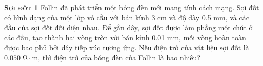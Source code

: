 
\begin{problem}{\textbf{\textsc{Sợi đốt 1}}\hspace{1mm}}
	Follin đã phát triển một bóng đèn mới mang tính cách mạng. Sợi đốt có hình dạng của một lớp vỏ cầu với bán kính 3 cm và độ dày 0.5 mm, và các đầu của sợi đốt đối diện nhau. Để gắn dây, sợi đốt được làm phẳng một chút ở các đầu, tạo thành hai vòng tròn với bán kính 0.01 mm, mỗi vòng hoàn toàn được bao phủ bởi dây tiếp xúc tương ứng. Nếu điện trở của vật liệu sợi đốt là $0.050\;\mathrm{\Omega\cdot m}$, thì điện trở của bóng đèn của Follin là bao nhiêu?
\end{problem}
